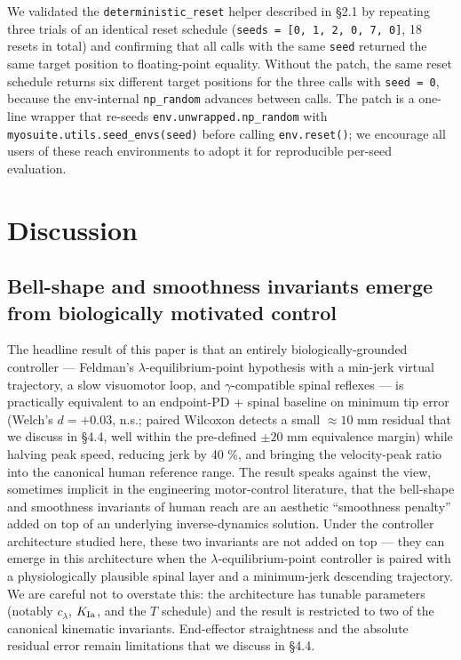 \documentclass[sn-basic]{sn-jnl}
\begin{document}
We validated the \texttt{deterministic\_reset} helper described in §2.1
by repeating three trials of an identical reset schedule
(\texttt{seeds\ =\ {[}0,\ 1,\ 2,\ 0,\ 7,\ 0{]}}, 18 resets in total) and
confirming that all calls with the same \texttt{seed} returned the same
target position to floating-point equality. Without the patch, the same
reset schedule returns six different target positions for the three
calls with \texttt{seed\ =\ 0}, because the env-internal
\texttt{np\_random} advances between calls. The patch is a one-line
wrapper that re-seeds \texttt{env.unwrapped.np\_random} with
\texttt{myosuite.utils.seed\_envs(seed)} before calling
\texttt{env.reset()}; we encourage all users of these reach environments
to adopt it for reproducible per-seed evaluation.


\section{Discussion}

\subsection{Bell-shape and smoothness invariants emerge from
biologically motivated
control}

The headline result of this paper is that an entirely
biologically-grounded controller --- Feldman's $\lambda$-equilibrium-point
hypothesis with a min-jerk virtual trajectory, a slow visuomotor loop,
and $\gamma$-compatible spinal reflexes --- is practically equivalent to an
endpoint-PD + spinal baseline on minimum tip error (Welch's
\(d = +0.03\), n.s.; paired Wilcoxon detects a small \(\approx 10\) mm
residual that we discuss in §4.4, well within the pre-defined \(\pm 20\)
mm equivalence margin) while halving peak speed, reducing jerk by 40 \%,
and bringing the velocity-peak ratio into the canonical human reference
range. The result speaks against the view, sometimes implicit in the
engineering motor-control literature, that the bell-shape and smoothness
invariants of human reach are an aesthetic ``smoothness penalty'' added
on top of an underlying inverse-dynamics solution. Under the controller
architecture studied here, these two invariants are not added on top ---
they can emerge in this architecture when the $\lambda$-equilibrium-point
controller is paired with a physiologically plausible spinal layer and a
minimum-jerk descending trajectory. We are careful not to overstate
this: the architecture has tunable parameters (notably \(c_{\lambda}\),
\(K_{\rm Ia}\), and the \(T\) schedule) and the result is restricted to
two of the canonical kinematic invariants. End-effector straightness and
the absolute residual error remain limitations that we discuss in §4.4.
\end{document}
